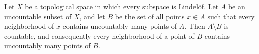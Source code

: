 Let $X$ be a topological space in which every subspace is Lindel\"of. Let $A$ be an uncountable subset of $X$, and let $B$ be the set of all points $x \in A$ such that every neighborhood of $x$ contains uncountably many points of $A$. Then $A \setminus B$ is countable, and consequently every neighborhood of a point of $B$ contains uncountably many points of $B$.
